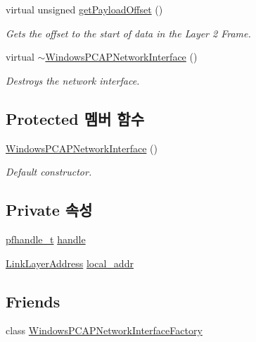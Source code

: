 \begin{DoxyCompactItemize}
virtual unsigned \hyperlink{class_windows_p_c_a_p_network_interface_a469ba253e35431e728100188397d9d02}{get\+Payload\+Offset} ()
\begin{DoxyCompactList}\small\item\em Gets the offset to the start of data in the Layer 2 Frame. \end{DoxyCompactList}\item 
virtual \hyperlink{class_windows_p_c_a_p_network_interface_a5c4ff5dec1446e85c974a45d252b7c8b}{$\sim$\+Windows\+P\+C\+A\+P\+Network\+Interface} ()
\begin{DoxyCompactList}\small\item\em Destroys the network interface. \end{DoxyCompactList}\end{DoxyCompactItemize}
\subsection*{Protected 멤버 함수}
\begin{DoxyCompactItemize}
\item 
\hyperlink{class_windows_p_c_a_p_network_interface_aa91d5b6cf080af5ac5ef2f4a9a15adb1}{Windows\+P\+C\+A\+P\+Network\+Interface} ()
\begin{DoxyCompactList}\small\item\em Default constructor. \end{DoxyCompactList}\end{DoxyCompactItemize}
\subsection*{Private 속성}
\begin{DoxyCompactItemize}
\item 
\hyperlink{packet_8hpp_aab105b47ccfc96b97b2dd5bc7b7e65d2}{pfhandle\+\_\+t} \hyperlink{class_windows_p_c_a_p_network_interface_af365a053e5f8823efe7e4ed6a209cd8e}{handle}
\item 
\hyperlink{class_link_layer_address}{Link\+Layer\+Address} \hyperlink{class_windows_p_c_a_p_network_interface_af3d1546f688fbb9cec0317d152cab1da}{local\+\_\+addr}
\end{DoxyCompactItemize}
\subsection*{Friends}
\begin{DoxyCompactItemize}
\item 
class \hyperlink{class_windows_p_c_a_p_network_interface_af9a4356027aac1b398ffd7c7f60398bc}{Windows\+P\+C\+A\+P\+Network\+Interface\+Factory}
\end{DoxyCompactItemize}


